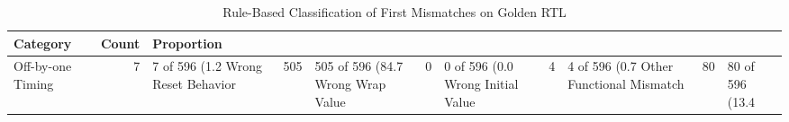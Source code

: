 \begin{table}
\caption{Rule-Based Classification of First Mismatches on Golden RTL}
\label{tab:taxonomy}
\begin{tabular}{lrl}
\toprule
Category & Count & Proportion \\
\midrule
Off-by-one Timing & 7 & 7 of 596 (1.2%
Wrong Reset Behavior & 505 & 505 of 596 (84.7%
Wrong Wrap Value & 0 & 0 of 596 (0.0%
Wrong Initial Value & 4 & 4 of 596 (0.7%
Other Functional Mismatch & 80 & 80 of 596 (13.4%
\bottomrule
\end{tabular}
\end{table}

